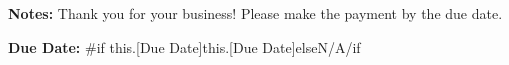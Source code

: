 \documentclass{article}
\begin{document}
\vspace{1cm}

\textbf{Notes:} Thank you for your business! Please make the payment by the due date.

\vspace{2cm}

\begin{flushright}
    \textbf{Due Date:} {{#if this.[Due Date]}}{{this.[Due Date]}}{{else}}N/A{{/if}}
\end{flushright}
\end{document}

